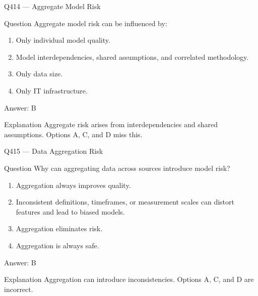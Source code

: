 \documentclass[aspectratio=169,8pt]{beamer}
\begin{document}
	\begin{frame}{Q414 --- Aggregate Model Risk}
		\begin{block}{Question}
			Aggregate model risk can be influenced by:
			\begin{enumerate}
				\item Only individual model quality.
				\item Model interdependencies, shared assumptions, and correlated methodology.
				\item Only data size.
				\item Only IT infrastructure.
			\end{enumerate}
		\end{block}
		\begin{exampleblock}{Answer: B}\end{exampleblock}
		\begin{block}{Explanation}
			Aggregate risk arises from interdependencies and shared assumptions. Options A, C, and D miss this.
		\end{block}
	\end{frame}
	
	\begin{frame}{Q415 --- Data Aggregation Risk}
		\begin{block}{Question}
			Why can aggregating data across sources introduce model risk?
			\begin{enumerate}
				\item Aggregation always improves quality.
				\item Inconsistent definitions, timeframes, or measurement scales can distort features and lead to biased models.
				\item Aggregation eliminates risk.
				\item Aggregation is always safe.
			\end{enumerate}
		\end{block}
		\begin{exampleblock}{Answer: B}\end{exampleblock}
		\begin{block}{Explanation}
			Aggregation can introduce inconsistencies. Options A, C, and D are incorrect.
		\end{block}
	\end{frame}
	
\end{document}
